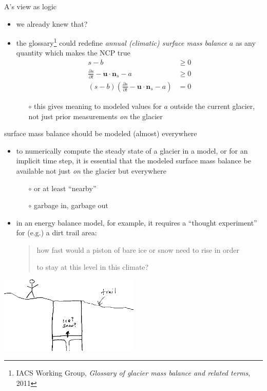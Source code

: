 \documentclass[10pt,hyperref,dvipsnames]{beamer}
\newcommand{\bn}{\mathbf{n}}
\newcommand{\bu}{\mathbf{u}}
\begin{document}
\begin{frame}{A's view as logic}
\begin{itemize}
\item we already knew that?
\item the glossary\footnote{IACS Working Group, \emph{Glossary of glacier mass balance and related terms}, 2011} could redefine \emph{annual (climatic) surface mass balance} $a$ as any quantity which makes the NCP true
\begin{align*}
s-b &\ge 0 \\
\frac{\partial s}{\partial t} - \bu \cdot \bn_s - a &\ge 0 \\
(s-b) \left(\frac{\partial s}{\partial t} - \bu \cdot \bn_s - a\right) &= 0
\end{align*}

\vspace{-2mm}
    \begin{itemize}
    \item[$\circ$] this gives meaning to modeled values for $a$ outside the current glacier, not just prior measurements \emph{on} the glacier
    \end{itemize}
\end{itemize}
\end{frame}


\begin{frame}{surface mass balance should be modeled (almost) everywhere}
\begin{itemize}
\item to numerically compute the steady state of a glacier in a model, or for an implicit time step, it is essential that the modeled surface mass balance be available not just \emph{on} the glacier but everywhere
    \begin{itemize}
    \item[$\circ$] or at least ``nearby''
    \item[$\circ$] garbage in, garbage out
    \end{itemize}
\item in an energy balance model, for example, it requires a ``thought experiment'' for (e.g.) a dirt trail area:

\begin{quotation}
how fast would a piston of bare ice or snow need to rise in order

to stay at this level in this climate?
\end{quotation}
\end{itemize}

\begin{center}
\includegraphics[width=0.5\textwidth]{figs/pistontrail.png}
\end{center}
\end{frame}
\end{document}
